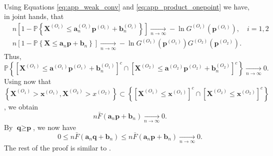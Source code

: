 \documentclass[11pt]{article}
\makeatletter
\theoremstyle{definition}
\renewenvironment{proof}[1][\proofname]{\par
\pushQED{\qed}%
\normalfont \topsep6\p@\@plus6\p@\relax
\trivlist
\item\relax
{\textbf{
#1\@addpunct{ }}}\hspace\labelsep\ignorespaces
}{%
\popQED\endtrivlist\@endpefalse
}
\makeatother
\begin{document}
\begin{proof}
\begin{align*}
		\end{align*}
		Using Equations \eqref{eq:app_weak_conv} and \eqref{eq:app_product_onepoint} we have, in joint hands, that
		\begin{align*}
		&n \left[ 1 - \mathbb{P}\left\{ \textbf{X}^{(O_i)} \leq \textbf{a}_n^{(O_i)} \textbf{p}^{(O_i)} + \textbf{b}_n^{(O_i)} \right\} \right] \underset{n \rightarrow \infty}{\longrightarrow} - \ln G^{(O_i)} (\textbf{p}^{(O_i)}), \quad i =1,2 \\
		&n \left[ 1 - \mathbb{P}\left\{ \textbf{X} \leq \textbf{a}_n \textbf{p} + \textbf{b}_n \right\} \right] \underset{n \rightarrow \infty}{\longrightarrow} - \ln G^{(O_1)} (\textbf{p}^{(O_1)})G^{(O_2)} (\textbf{p}^{(O_2)}).
		\end{align*}
		Thus,
		\begin{equation*}
			\mathbb{P} \left\{ \left[\textbf{X}^{(O_1)} \leq \textbf{a}^{(O_1)} \textbf{p}^{(O_1)} + \textbf{b}_n^{(O_1)} \right]^c \cap \left[\textbf{X}^{(O_2)} \leq \textbf{a}^{(O_2)} \textbf{p}^{(O_2)} + \textbf{b}_n^{(O_2)} \right]^c \right\} \underset{n \rightarrow \infty}{\longrightarrow} 0.
		\end{equation*}
		Using now that $\left\{ \textbf{X}^{(O_1)} > \textbf{x}^{(O_1)}, \textbf{X}^{(O_2)} > x^{(O_2)} \right\} \subset \left\{ [\textbf{X}^{(O_1)} \leq \textbf{x}^{(O_1)}]^c \cap [\textbf{X}^{(O_2)} \leq \textbf{x}^{(O_2)}]^c \right\}$, we obtain
		\begin{equation*}
			 n \bar{F}(\textbf{a}_n \textbf{p} + \textbf{b}_n) \underset{n \rightarrow \infty}{\longrightarrow} 0.
		\end{equation*}
		By $\textbf{q} \geq \textbf{p}$, we now have
		\begin{equation*}
			0 \leq n \bar{F}(\textbf{a}_n \textbf{q} + \textbf{b}_n) \leq n \bar{F}(\textbf{a}_n \textbf{p} + \textbf{b}_n) \underset{n \rightarrow \infty}{\longrightarrow} 0.
		\end{equation*}
		The rest of the proof is similar to \cite{takahashi1994asymptotic}.
	\end{proof}
	
\end{document}

